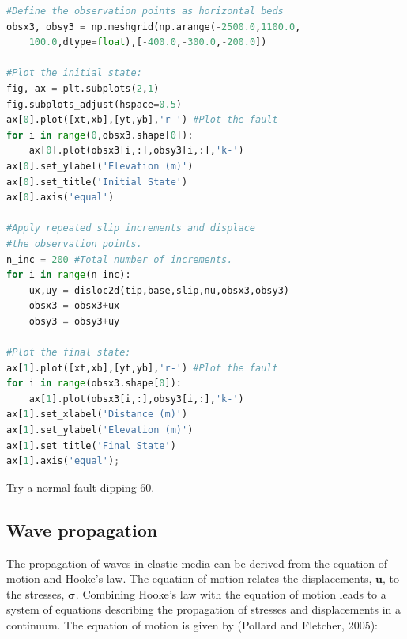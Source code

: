 \documentclass[a4paper , 12pt]{book}
\begin{document}
\begin{center}
\begin{lstlisting}[language=Python, frame=single]
#Define the observation points as horizontal beds
obsx3, obsy3 = np.meshgrid(np.arange(-2500.0,1100.0,
    100.0,dtype=float),[-400.0,-300.0,-200.0])

#Plot the initial state:
fig, ax = plt.subplots(2,1)
fig.subplots_adjust(hspace=0.5)
ax[0].plot([xt,xb],[yt,yb],'r-') #Plot the fault
for i in range(0,obsx3.shape[0]):
    ax[0].plot(obsx3[i,:],obsy3[i,:],'k-')
ax[0].set_ylabel('Elevation (m)')
ax[0].set_title('Initial State')
ax[0].axis('equal')

#Apply repeated slip increments and displace 
#the observation points.
n_inc = 200 #Total number of increments.
for i in range(n_inc):
    ux,uy = disloc2d(tip,base,slip,nu,obsx3,obsy3)
    obsx3 = obsx3+ux
    obsy3 = obsy3+uy
    
#Plot the final state:
ax[1].plot([xt,xb],[yt,yb],'r-') #Plot the fault
for i in range(obsx3.shape[0]):
    ax[1].plot(obsx3[i,:],obsy3[i,:],'k-')
ax[1].set_xlabel('Distance (m)')
ax[1].set_ylabel('Elevation (m)')
ax[1].set_title('Final State')
ax[1].axis('equal');
\end{lstlisting}
\end{center}

Try a normal fault dipping 60\degree.

\subsection{Wave propagation}\label{waveProp}

The propagation of waves in elastic media can be derived from the equation of motion and Hooke's law. The equation of motion relates the displacements, $\mathbf{u}$, to the stresses, $\boldsymbol{\sigma}$. Combining Hooke's law with the equation of motion leads to a system of equations describing the propagation of stresses and displacements in a continuum. The equation of motion is given by (Pollard and Fletcher, 2005):
\end{document}
